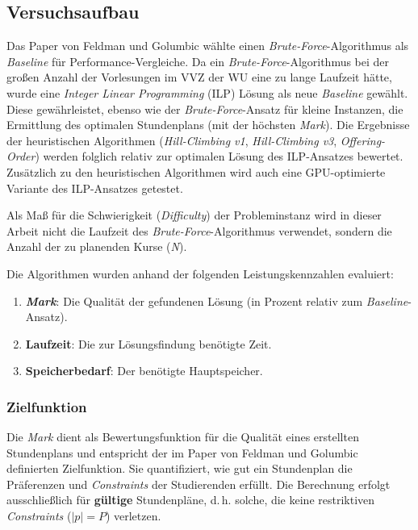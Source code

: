 \subsection{Versuchsaufbau}

Das Paper von Feldman und Golumbic \cite{feldmangolumbic} wählte einen \textit{Brute-Force}-Algorithmus als \textit{Baseline} für Performance-Vergleiche.
Da ein \textit{Brute-Force}-Algorithmus bei der großen Anzahl der Vorlesungen im VVZ der WU eine zu lange Laufzeit hätte, wurde eine \textit{Integer Linear Programming} (ILP) Lösung als neue \textit{Baseline} gewählt. Diese gewährleistet, ebenso wie der \textit{Brute-Force}-Ansatz für kleine Instanzen, die Ermittlung des optimalen Stundenplans (mit der höchsten \textit{Mark}). Die Ergebnisse der heuristischen Algorithmen (\textit{Hill-Climbing v1}, \textit{Hill-Climbing v3}, \textit{Offering-Order}) werden folglich relativ zur optimalen Lösung des ILP-Ansatzes bewertet. Zusätzlich zu den heuristischen Algorithmen wird auch eine GPU-optimierte Variante des ILP-Ansatzes getestet.

Als Maß für die Schwierigkeit (\textit{Difficulty}) der Probleminstanz wird in dieser Arbeit nicht die Laufzeit des \textit{Brute-Force}-Algorithmus verwendet, sondern die Anzahl der zu planenden Kurse (\textit{N}).

Die Algorithmen wurden anhand der folgenden Leistungskennzahlen evaluiert:
\begin{enumerate}
  \item \textbf{\textit{Mark}}: Die Qualität der gefundenen Lösung (in Prozent relativ zum \textit{Baseline}-Ansatz).
  \item \textbf{Laufzeit}: Die zur Lösungsfindung benötigte Zeit.
  \item \textbf{Speicherbedarf}: Der benötigte Hauptspeicher.
\end{enumerate}


\subsubsection{Zielfunktion}

Die \textit{Mark} dient als Bewertungsfunktion für die Qualität eines erstellten Stundenplans und entspricht der im Paper von Feldman und Golumbic \cite{feldmangolumbic} definierten Zielfunktion. Sie quantifiziert, wie gut ein Stundenplan die Präferenzen und \textit{Constraints} der Studierenden erfüllt. Die Berechnung erfolgt ausschließlich für \textbf{gültige} Stundenpläne, d.\,h. solche, die keine restriktiven \textit{Constraints} (\(|p| = P\)) verletzen.

